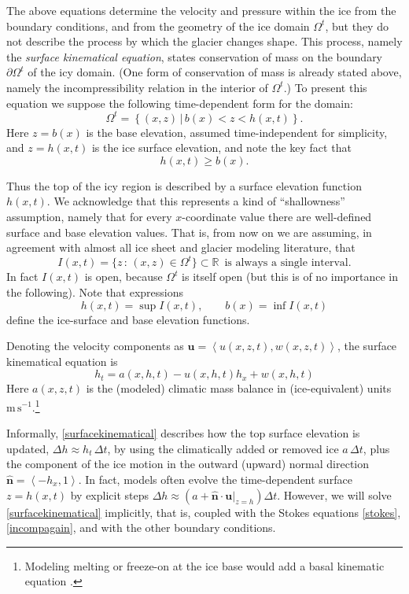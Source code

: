 \documentclass[letterpaper,final,12pt,reqno]{amsart}
\newcommand{\RR}{\mathbb{R}}
\newcommand{\hbn}{\hat{\mathbf{n}}}
\newcommand{\bu}{\mathbf{u}}
\begin{document}
The above equations determine the velocity and pressure within the ice from the boundary conditions, and from the geometry of the ice domain $\Omega^t$, but they do not describe the process by which the glacier changes shape.  This process, namely the \emph{surface kinematical equation}, states conservation of mass on the boundary $\partial\Omega^t$ of the icy domain.  (One form of conservation of mass is already stated above, namely the incompressibility relation in the interior of $\Omega^t$.)  To present this equation we suppose the following time-dependent form for the domain:
\begin{equation}
\Omega^t = \left\{(x,z)\,\big|\, b(x) < z < h(x,t)\right\}.  \label{Omegat}
\end{equation}
Here $z=b(x)$ is the base elevation, assumed time-independent for simplicity, and $z=h(x,t)$ is the ice surface elevation, and note the key fact that
\begin{equation}
h(x,t) \ge b(x).  \label{admissibility}
\end{equation}

Thus the top of the icy region is described by a surface elevation function $h(x,t)$.  We acknowledge that this represents a kind of ``shallowness'' assumption, namely that for every $x$-coordinate value there are well-defined surface and base elevation values.  That is, from now on we are assuming, in agreement with almost all ice sheet and glacier modeling literature, that
\begin{equation}
I(x,t) = \{z\,:\,(x,z) \in \Omega^t\} \subset \RR \, \text{ is always a single interval}.\label{intervalassume}
\end{equation}
In fact $I(x,t)$ is open, because $\Omega^t$ is itself open (but this is of no importance in the following).  Note that expressions
    $$h(x,t) = \sup I(x,t), \qquad b(x) = \inf I(x,t)$$
define the ice-surface and base elevation functions.

Denoting the velocity components as $\bu=\left<u(x,z,t),w(x,z,t)\right>$, the surface kinematical equation is
\begin{equation}
h_t = a(x,h,t) - u(x,h,t) h_x + w(x,h,t) \label{surfacekinematical}
\end{equation}
Here $a(x,z,t)$ is the (modeled) climatic mass balance in (ice-equivalent) units $\text{m}\,\text{s}^{-1}$.\footnote{Modeling melting or freeze-on at the ice base would add a basal kinematic equation \cite{Aschwandenetal2012}.}

Informally, \eqref{surfacekinematical} describes how the top surface elevation is updated, $\Delta h \approx h_t\,\Delta t$, by using the climatically added or removed ice $a\,\Delta t$, plus the component of the ice motion in the outward (upward) normal direction $\hbn = \left<-h_x,1\right>$.  In fact, models often evolve the time-dependent surface $z=h(x,t)$ by explicit steps $\Delta h \approx \left(a + \hbn\cdot \bu|_{z=h}\right) \Delta t$.  However, we will solve \eqref{surfacekinematical} implicitly, that is, coupled with the Stokes equations \eqref{stokes}, \eqref{incompagain}, and with the other boundary conditions.
\end{document}
